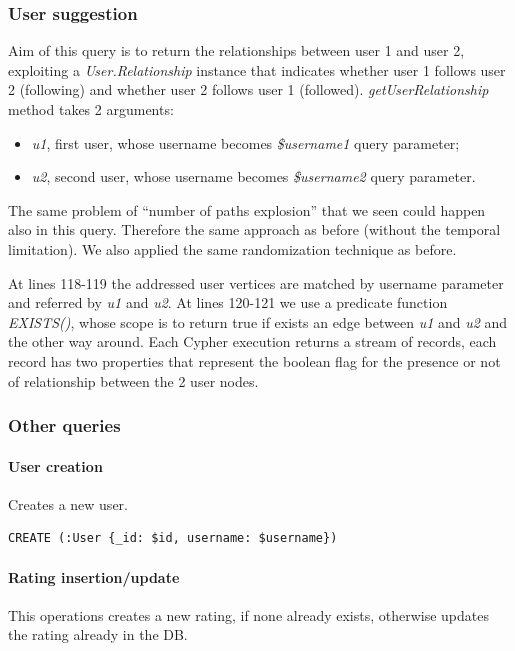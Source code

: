 \documentclass[11pt]{article}
\begin{document}
\subsubsection{User suggestion}
Aim of this query is to return the relationships between user 1 and user 2, exploiting a \emph{User.Relationship} instance that indicates whether user 1 follows user 2 (following) and whether user 2 follows user 1 (followed).
\emph{getUserRelationship} method takes 2 arguments:

\begin{itemize}
    \item \emph{u1}, first user, whose username becomes \emph{\$username1} query parameter;
    \item \emph{u2}, second user, whose username becomes \emph{\$username2} query parameter.
\end{itemize}

The same problem of ``number of paths explosion'' that we seen could happen also in this query. Therefore the same approach as before (without the temporal limitation). We also applied the same randomization technique as before.



At lines 118-119 the addressed user vertices are matched by username parameter and referred by \emph{u1} and \emph{u2}.
At lines 120-121 we use a predicate function \emph{EXISTS()}, whose scope is to return true if exists an edge between \emph{u1} and \emph{u2} and the other way around.
Each Cypher execution returns a stream of records, each record has two properties that represent the boolean flag for the presence or not of relationship between the 2 user nodes.
\subsubsection{Other queries}

\paragraph{User creation} Creates a new user.

\begin{lstlisting}[language=Cypher]
CREATE (:User {_id: $id, username: $username})
\end{lstlisting}

\paragraph{Rating insertion/update} This operations creates a new rating, if none already exists, otherwise updates the rating already in the DB.
\end{document}

